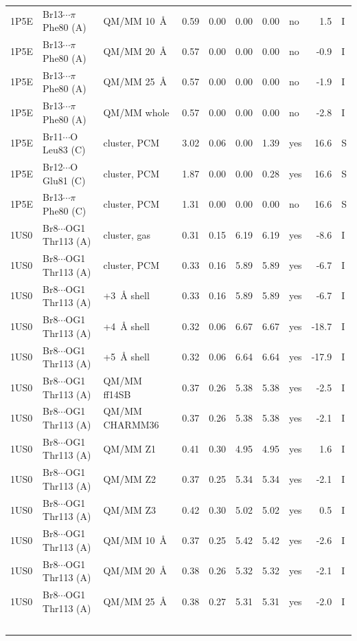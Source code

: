 {\begin{longtable}{lllrrrrlrl}
1P5E & Br13$\cdots$$\pi$ Phe80 (A) & QM/MM 10~\AA{} & 0.59 & 0.00 & 0.00 & 0.00 & no & 1.5 & I\\
1P5E & Br13$\cdots$$\pi$ Phe80 (A) & QM/MM 20~\AA{} & 0.57 & 0.00 & 0.00 & 0.00 & no & -0.9 & I\\
1P5E & Br13$\cdots$$\pi$ Phe80 (A) & QM/MM 25~\AA{} & 0.57 & 0.00 & 0.00 & 0.00 & no & -1.9 & I\\
1P5E & Br13$\cdots$$\pi$ Phe80 (A) & QM/MM whole & 0.57 & 0.00 & 0.00 & 0.00 & no & -2.8 & I\\
1P5E & Br11$\cdots$O Leu83 (C) & cluster, PCM & 3.02 & 0.06 & 0.00 & 1.39 & yes & 16.6 & S\\
1P5E & Br12$\cdots$O Glu81 (C) & cluster, PCM & 1.87 & 0.00 & 0.00 & 0.28 & yes & 16.6 & S\\
1P5E & Br13$\cdots$$\pi$ Phe80 (C) & cluster, PCM & 1.31 & 0.00 & 0.00 & 0.00 & no & 16.6 & S\\
1US0 & Br8$\cdots$OG1 Thr113 (A) & cluster, gas & 0.31 & 0.15 & 6.19 & 6.19 & yes & -8.6 & I\\
1US0 & Br8$\cdots$OG1 Thr113 (A) & cluster, PCM & 0.33 & 0.16 & 5.89 & 5.89 & yes & -6.7 & I\\
1US0 & Br8$\cdots$OG1 Thr113 (A) & +3~\AA{} shell & 0.33 & 0.16 & 5.89 & 5.89 & yes & -6.7 & I\\
1US0 & Br8$\cdots$OG1 Thr113 (A) & +4~\AA{} shell & 0.32 & 0.06 & 6.67 & 6.67 & yes & -18.7 & I\\
1US0 & Br8$\cdots$OG1 Thr113 (A) & +5~\AA{} shell & 0.32 & 0.06 & 6.64 & 6.64 & yes & -17.9 & I\\
1US0 & Br8$\cdots$OG1 Thr113 (A) & QM/MM ff14SB & 0.37 & 0.26 & 5.38 & 5.38 & yes & -2.5 & I\\
1US0 & Br8$\cdots$OG1 Thr113 (A) & QM/MM CHARMM36 & 0.37 & 0.26 & 5.38 & 5.38 & yes & -2.1 & I\\
1US0 & Br8$\cdots$OG1 Thr113 (A) & QM/MM Z1 & 0.41 & 0.30 & 4.95 & 4.95 & yes & 1.6 & I\\
1US0 & Br8$\cdots$OG1 Thr113 (A) & QM/MM Z2 & 0.37 & 0.25 & 5.34 & 5.34 & yes & -2.1 & I\\
1US0 & Br8$\cdots$OG1 Thr113 (A) & QM/MM Z3 & 0.42 & 0.30 & 5.02 & 5.02 & yes & 0.5 & I\\
1US0 & Br8$\cdots$OG1 Thr113 (A) & QM/MM 10~\AA{} & 0.37 & 0.25 & 5.42 & 5.42 & yes & -2.6 & I\\
1US0 & Br8$\cdots$OG1 Thr113 (A) & QM/MM 20~\AA{} & 0.38 & 0.26 & 5.32 & 5.32 & yes & -2.1 & I\\
1US0 & Br8$\cdots$OG1 Thr113 (A) & QM/MM 25~\AA{} & 0.38 & 0.27 & 5.31 & 5.31 & yes & -2.0 & I\\
$$
\end{longtable}}
